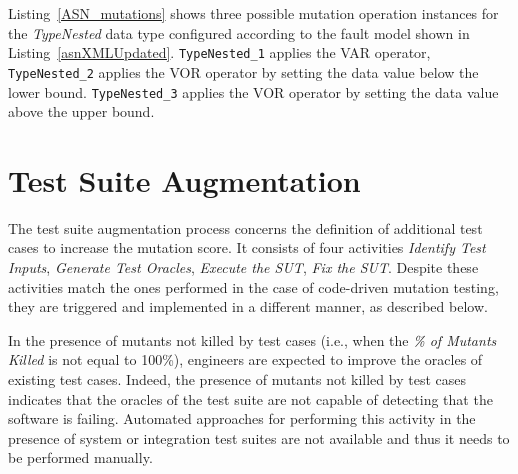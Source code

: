 




Listing~\ref{ASN_mutations} shows three possible mutation operation instances for the \emph{TypeNested} data type configured according to the fault model shown in Listing~\ref{asnXMLUpdated}.
\texttt{TypeNested\_1} applies the VAR operator,
 \texttt{TypeNested\_2} applies the VOR operator by setting the data value below the lower bound.
 \texttt{TypeNested\_3} applies the VOR operator by setting the data value above the upper bound.



\clearpage



\clearpage
\section{Test Suite Augmentation} %
\label{sec:data:test_suite_augmentation}


The test suite augmentation process concerns the definition of additional test cases to increase the mutation score.
It consists of four activities \emph{Identify Test Inputs}, \emph{Generate Test Oracles}, \emph{Execute the SUT}, \emph{Fix the SUT}. 
Despite these activities match the ones performed in the case of code-driven mutation testing, they are triggered and implemented in a different manner, as described below.

In the presence of mutants not killed by test cases (i.e., when the \emph{\% of Mutants Killed} is not equal to 100\%), engineers are expected to improve the oracles of existing test cases. Indeed, the presence of mutants not killed by test cases indicates that the oracles of the test suite are not capable of detecting that the software is failing. 
Automated approaches for performing this activity in the presence of system or integration test suites are not available and thus it needs to be performed manually.

